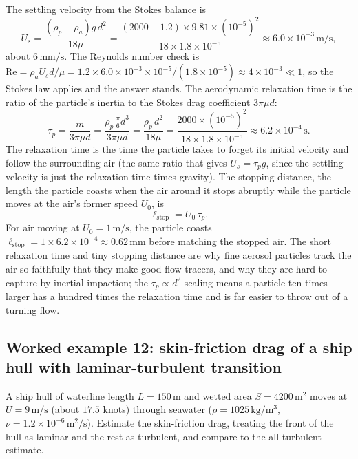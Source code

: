 The settling velocity from the Stokes balance is
\[
U_s = \frac{(\rho_p - \rho_a)g\,d^2}{18\mu} = \frac{(2000-1.2)\times
9.81\times(10^{-5})^2}{18\times1.8\times10^{-5}} \approx 6.0\times
10^{-3}\,\si{\meter\per\second},
\]
about $6\,\si{\milli\meter\per\second}$. The Reynolds number check is
$\text{Re} = \rho_a U_s d/\mu = 1.2\times6.0\times10^{-3}\times10^{-5}
/(1.8\times10^{-5}) \approx 4\times10^{-3}\ll1$, so the Stokes law
applies and the answer stands. The aerodynamic relaxation time is the
ratio of the particle's inertia to the Stokes drag coefficient
$3\pi\mu d$:
\[
\tau_p = \frac{m}{3\pi\mu d} = \frac{\rho_p\,\tfrac{\pi}{6}d^3}{
3\pi\mu d} = \frac{\rho_p\,d^2}{18\mu} = \frac{2000\times(10^{-5})^2}{
18\times1.8\times10^{-5}} \approx 6.2\times10^{-4}\,\si{\second}.
\]
The relaxation time is the time the particle takes to forget its
initial velocity and follow the surrounding air (the same ratio that
gives $U_s = \tau_p g$, since the settling velocity is just the
relaxation time times gravity). The stopping distance, the length the
particle coasts when the air around it stops abruptly while the
particle moves at the air's former speed $U_0$, is
\[
\ell_{\text{stop}} = U_0\,\tau_p.
\]
For air moving at $U_0 = 1\,\si{\meter\per\second}$, the particle
coasts $\ell_{\text{stop}} = 1\times6.2\times10^{-4} \approx
0.62\,\si{\milli\meter}$ before matching the stopped air. The short
relaxation time and tiny stopping distance are why fine aerosol
particles track the air so faithfully that they make good flow
tracers, and why they are hard to capture by inertial impaction; the
$\tau_p\propto d^2$ scaling means a particle ten times larger has a
hundred times the relaxation time and is far easier to throw out of a
turning flow.

\subsection*{Worked example 12: skin-friction drag of a ship hull with laminar-turbulent transition}

A ship hull of waterline length $L = 150\,\si{\meter}$ and wetted
area $S = 4200\,\si{\meter\squared}$ moves at $U = 9\,\si{\meter\per
\second}$ (about $17.5$ knots) through seawater ($\rho = 1025\,\si{
\kilogram\per\meter\cubed}$, $\nu = 1.2\times10^{-6}\,\si{\meter}^2/
\si{\second}$). Estimate the skin-friction drag, treating the front
of the hull as laminar and the rest as turbulent, and compare to the
all-turbulent estimate.

